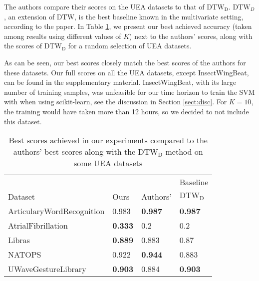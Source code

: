 
The authors compare their scores on the UEA datasets to that of $\mathrm{DTW_D}$. $\text{DTW}_D$, an extension of DTW, is the best baseline known in the multivariate setting, according to the paper. In Table \ref{tab:uea}, we present our best achieved accuracy (taken among results using different values of $K$) next to the authors' scores, along with the scores of $\mathrm{DTW_D}$ for a random selection of UEA datasets.

As can be seen, our best scores closely match the best scores of the authors for these datasets. Our full scores on all the UEA datasets, except InsectWingBeat, can be found in the supplementary material. InsectWingBeat, with its large number of training samples, was unfeasible for our time horizon to train the SVM with when using scikit-learn, see the discussion in Section \ref{sect:disc}. For $K=10$, the training would have taken more than 12 hours, so we decided to not include this dataset.


\begin{table}[h!]
\caption{Best scores achieved in our experiments compared to the authors' best scores along with the $\mathrm{DTW_D}$ method on some UEA datasets}
\label{tab:uea}
\centering
\begin{tabular}{llll}
    \hline
               &       &          & \vrule Baseline \\
    
    Dataset          & Ours  & Authors' &\vrule $\mathrm{DTW_D}$  \\
    \hline
    ArticularyWordRecognition & 0.983           & \textbf{0.987}    & \textbf{0.987} \\
    AtrialFibrillation        & \textbf{0.333}   & 0.2      & 0.2   \\
    Libras                    & \textbf{0.889} & 0.883             & 0.87           \\
    NATOPS                    & 0.922 & \textbf{0.944}    & 0.883          \\
    UWaveGestureLibrary       & \textbf{0.903}          & 0.884             & \textbf{0.903}
\end{tabular}
\end{table}


